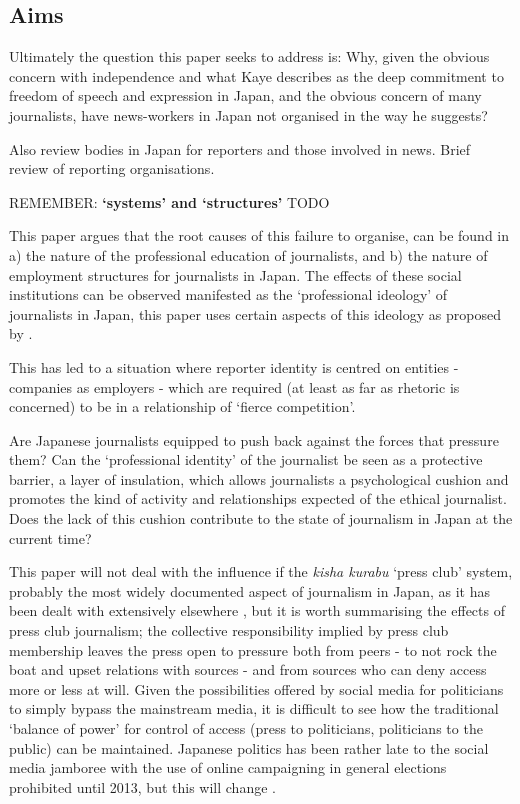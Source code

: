 \documentclass[11pt, headings=normal]{scrartcl}
\begin{document}
\hypertarget{aims}{%
\subsection{Aims}\label{aims}}

Ultimately the question this paper seeks to address is: Why, given the
obvious concern with independence and what Kaye describes as the deep
commitment to freedom of speech and expression in Japan, and the obvious
concern of many journalists, have news-workers in Japan not organised in
the way he suggests?

{Also review bodies in Japan for reporters and those involved in news.
Brief review of reporting organisations.}

REMEMBER: \textbf{`systems' and `structures'} {TODO}

This paper argues that the root causes of this failure to organise, can
be found in a) the nature of the professional education of journalists,
and b) the nature of employment structures for journalists in Japan. The
effects of these social institutions can be observed manifested as the
`professional ideology' of journalists in Japan, this paper uses certain
aspects of this ideology as proposed by \textcite{Deuze:2005}.

This has led to a situation where reporter identity is centred on
entities - companies as employers - which are required (at least as far
as rhetoric is concerned) to be in a relationship of `fierce
competition'.

Are Japanese journalists equipped to push back against the forces that
pressure them? Can the `professional identity' of the journalist be seen
as a protective barrier, a layer of insulation, which allows journalists
a psychological cushion and promotes the kind of activity and
relationships expected of the ethical journalist. Does the lack of this
cushion contribute to the state of journalism in Japan at the current
time?

This paper will not deal with the influence if the \emph{kisha kurabu}
`press club' system, probably the most widely documented aspect of
journalism in Japan, as it has been dealt with extensively elsewhere
\autocites[see for
example][]{Lange:1998}{Freeman:2000}{Iwase:1998}{Yamamoto:1989}, but it
is worth summarising the effects of press club journalism; the
collective responsibility implied by press club membership leaves the
press open to pressure both from peers - to not rock the boat and upset
relations with sources - and from sources who can deny access more or
less at will. Given the possibilities offered by social media for
politicians to simply bypass the mainstream media, it is difficult to
see how the traditional `balance of power' for control of access (press
to politicians, politicians to the public) can be maintained. Japanese
politics has been rather late to the social media jamboree with the use
of online campaigning in general elections prohibited until 2013, but
this will change \autocite[p51]{Osaka:2014}.
\end{document}
